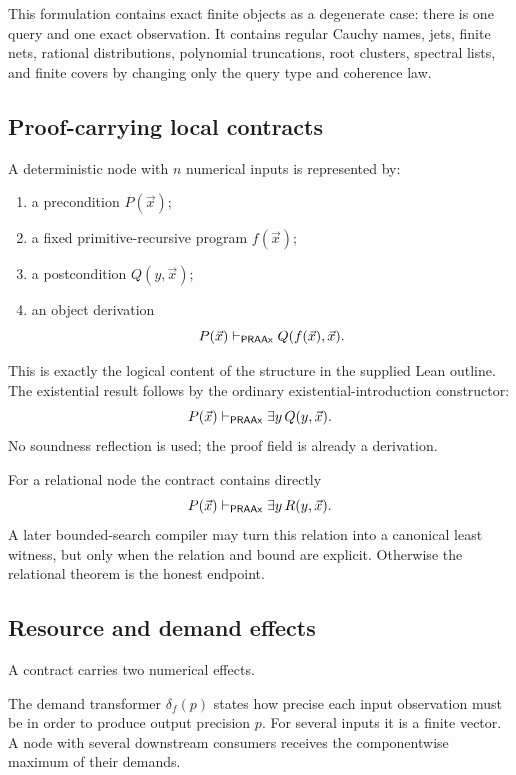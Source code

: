 This formulation contains exact finite objects as a degenerate case: there is one query and one exact observation.  It contains regular Cauchy names, jets, finite nets, rational distributions, polynomial truncations, root clusters, spectral lists, and finite covers by changing only the query type and coherence law.

\subsection{Proof-carrying local contracts}

A deterministic node with \(n\) numerical inputs is represented by:

\begin{enumerate}
  \item a precondition \(P(\vec x)\);
  \item a fixed primitive-recursive program \(f(\vec x)\);
  \item a postcondition \(Q(y,\vec x)\);
  \item an object derivation
  \[
       P(\vec x)\vdash_{\mathsf{PRAAx}} Q(f(\vec x),\vec x).
  \]
\end{enumerate}

This is exactly the logical content of the  structure in the supplied Lean outline.  The existential result follows by the ordinary existential-introduction constructor:
\[
  P(\vec x)\vdash_{\mathsf{PRAAx}}\exists y\,Q(y,\vec x).
\]
No soundness reflection is used; the proof field is already a derivation.

For a relational node the contract contains directly
\[
  P(\vec x)\vdash_{\mathsf{PRAAx}}\exists y\,R(y,\vec x).
\]
A later bounded-search compiler may turn this relation into a canonical least witness, but only when the relation and bound are explicit.  Otherwise the relational theorem is the honest endpoint.

\subsection{Resource and demand effects}

A contract carries two numerical effects.

\begin{definition}[Demand]
The demand transformer \(\delta_f(p)\) states how precise each input observation must be in order to produce output precision \(p\).  For several inputs it is a finite vector.  A node with several downstream consumers receives the componentwise maximum of their demands.
\end{definition}

